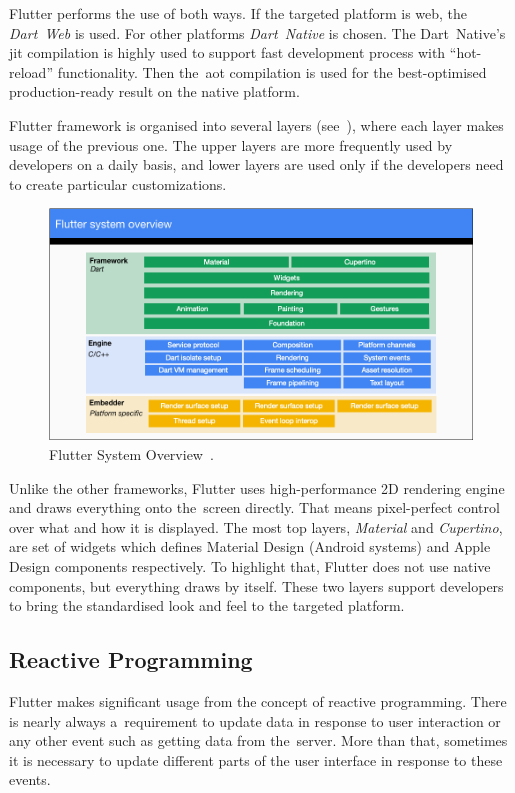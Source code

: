 Flutter performs the use of both ways. If the targeted platform is web, the \textit{Dart~Web} is used. For other platforms \textit{Dart~Native} is chosen. The Dart~Native's \gls{jit} compilation is highly used to support fast development process with ``hot-reload'' functionality. Then the~\gls{aot} compilation is used for the best-optimised production-ready result on the native platform.  

Flutter framework is organised into several layers (see~), where each layer makes usage of the previous one. The upper layers are more frequently used by developers on a daily basis, and lower layers are used only if the developers need to create particular customizations. 

\begin{figure}[htp]
    \centering
    \includegraphics[width=\linewidth]{img/flutter/flutter-layer-cake.png}
    \caption{Flutter System Overview~\cite{flutter-technical-overview}.}
    \label{fig:flutter-layer-cake}
\end{figure}

Unlike the other frameworks, Flutter uses high-performance 2D rendering engine and draws everything onto the~screen directly. That means pixel-perfect control over what and how it is displayed. The most top layers, \textit{Material} and \textit{Cupertino}, are set of widgets which defines Material Design (Android systems) and Apple Design components respectively. To highlight that, Flutter does not use native components, but everything draws by itself. These two layers support developers to bring the standardised look and feel to the targeted platform.
\subsection{Reactive Programming}
Flutter makes significant usage from the concept of reactive programming. There is nearly always a~requirement to update data in response to user interaction or any other event such as getting data from the~server. More than that, sometimes it is necessary to update different parts of the user interface in response to these events. 

